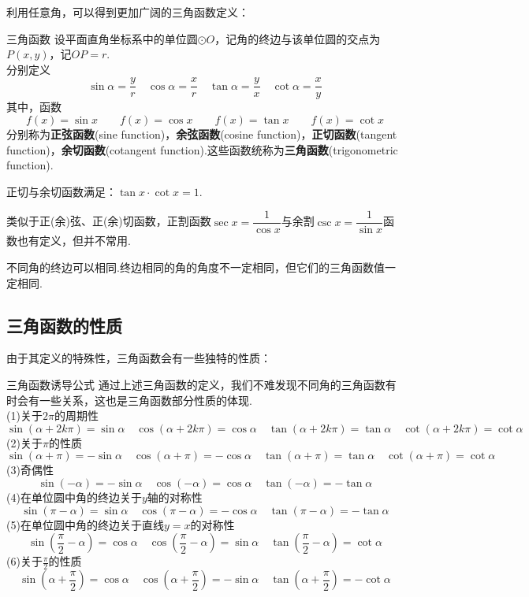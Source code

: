 \documentclass[lang=cn, zihao=5]{elegantbook}
\newcommand{\ssb}[1]{\left( #1 \right)}
\begin{document}
利用任意角，可以得到更加广阔的三角函数定义：

\begin{definition}{三角函数} %
    设平面直角坐标系中的单位圆$\odot O$，记角的终边与该单位圆的交点为$P(x,y)$，记$OP=r$.\\
    分别定义$$\sin{\alpha}=\frac{y}{r} \quad \cos{\alpha}=\frac{x}{r} \quad \tan{\alpha}=\frac{y}{x} \quad \cot{\alpha}=\frac{x}{y}$$
    其中，函数$$f(x)=\sin{x} \qquad f(x)=\cos{x} \qquad f(x)=\tan{x} \qquad f(x)=\cot{x}$$
    分别称为\textbf{正弦函数}(sine function)，\textbf{余弦函数}(cosine function)，\textbf{正切函数}(tangent function)，\textbf{余切函数}(cotangent function).这些函数统称为\textbf{三角函数}(trigonometric function).
\end{definition}
\begin{remark}
    正切与余切函数满足：$\tan{x} \cdot \cot{x} = 1$.
\end{remark}
\begin{remark}
    类似于正(余)弦、正(余)切函数，正割函数$\sec{x}=\dfrac{1}{\cos{x}}$与余割$\csc{x}=\dfrac{1}{\sin{x}}$函数也有定义，但并不常用.
\end{remark}
\begin{remark}
    不同角的终边可以相同.终边相同的角的角度不一定相同，但它们的三角函数值一定相同.
\end{remark}


\subsection{三角函数的性质}

由于其定义的特殊性，三角函数会有一些独特的性质：

\begin{proposition}{三角函数诱导公式} %
    通过上述三角函数的定义，我们不难发现不同角的三角函数有时会有一些关系，这也是三角函数部分性质的体现.\\
    (1)关于$2\pi$的周期性$$\sin{(\alpha + 2k\pi)}=\sin{\alpha} \quad \cos{(\alpha + 2k\pi)}=\cos{\alpha} \quad \tan{(\alpha + 2k\pi)}=\tan{\alpha} \quad \cot{(\alpha + 2k\pi)}=\cot{\alpha}$$
    (2)关于$\pi$的性质$$\sin{(\alpha + \pi)}=-\sin{\alpha} \quad \cos{(\alpha + \pi)}=-\cos{\alpha} \quad \tan{(\alpha + \pi)}=\tan{\alpha} \quad \cot{(\alpha + \pi)}=\cot{\alpha}$$
    (3)奇偶性$$\sin{(-\alpha)}=-\sin{\alpha} \quad \cos{(-\alpha)}=\cos{\alpha} \quad \tan{(-\alpha)}=-\tan{\alpha}$$
    (4)在单位圆中角的终边关于$y$轴的对称性$$\sin{(\pi - \alpha)} = \sin{\alpha} \quad \cos{(\pi - \alpha)} = -\cos{\alpha} \quad \tan{(\pi - \alpha)} = -\tan{\alpha}$$
    (5)在单位圆中角的终边关于直线$y=x$的对称性$$\sin{\ssb{\frac{\pi}{2}-\alpha}}=\cos{\alpha} \quad \cos{\ssb{\frac{\pi}{2}-\alpha}}=\sin{\alpha} \quad \tan{\ssb{\frac{\pi}{2}-\alpha}}=\cot{\alpha}$$
    (6)关于$\frac{\pi}{2}$的性质$$\sin{\ssb{\alpha+\frac{\pi}{2}}}=\cos{\alpha} \quad \cos{\ssb{\alpha+\frac{\pi}{2}}}=-\sin{\alpha} \quad \tan{\ssb{\alpha+\frac{\pi}{2}}}=-\cot{\alpha}$$
\end{proposition}
\end{document}
